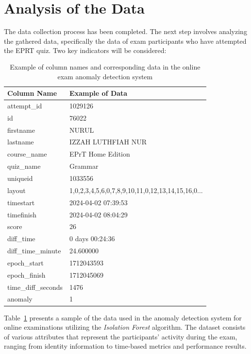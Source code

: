 \section{Analysis of the Data}
The data collection process has been completed. The next step involves analyzing the gathered data, specifically the data of exam participants who have attempted the EPRT quiz. Two key indicators will be considered:


\begin{table}[H]
\centering
\renewcommand{\arraystretch}{1.3}
\begin{tabular}{|p{4cm}|p{10cm}|}
\hline
\textbf{Column Name} & \textbf{Example of Data} \\
\hline
attempt\_id & 1029126 \\
\hline
id & 76022 \\
\hline
firstname & NURUL \\
\hline
lastname & IZZAH LUTHFIAH NUR \\
\hline
course\_name & EPrT Home Edition \\
\hline
quiz\_name & Grammar \\
\hline
uniqueid & 1033556 \\
\hline
layout & 1,0,2,3,4,5,6,0,7,8,9,10,11,0,12,13,14,15,16,0... \\
\hline
timestart & 2024-04-02 07:39:53 \\
\hline
timefinish & 2024-04-02 08:04:29 \\
\hline
score & 26 \\
\hline
diff\_time & 0 days 00:24:36 \\
\hline
diff\_time\_minute & 24.600000 \\
\hline
epoch\_start & 1712043593 \\
\hline
epoch\_finish & 1712045069 \\
\hline
time\_diff\_seconds & 1476 \\
\hline
anomaly & 1 \\
\hline
\end{tabular}
\caption{Example of column names and corresponding data in the online exam anomaly detection system}
\label{tab:anomaly_data}
\end{table}

Table~\ref{tab:anomaly_data} presents a sample of the data used in the anomaly detection system for online examinations utilizing the \textit{Isolation Forest} algorithm. The dataset consists of various attributes that represent the participants' activity during the exam, ranging from identity information to time-based metrics and performance results.

